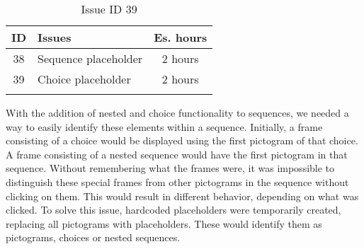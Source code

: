 \begin{longtable} { | c | p{12cm} | c | } 
\hline
	ID 	&	Issues	&		 Es. hours \\\hline
	38	&	Sequence placeholder	&	2 hours \\\hline
	39 	&	Choice placeholder	&	2 hours \\\hline
\caption{Issue ID 39}
\label{tab:spr3_choiceplaceholder}
\end{longtable}

With the addition of nested and choice functionality to sequences, we needed a way to easily identify these elements within a sequence. Initially, a frame consisting of a choice would be displayed using the first pictogram of that choice. A frame consisting of a nested sequence would have the first pictogram in that sequence. Without remembering what the frames were, it was impossible to distinguish these special frames from other pictograms in the sequence without clicking on them. This would result in different behavior, depending on what was clicked. To solve this issue, hardcoded placeholders were temporarily created, replacing all pictograms with placeholders. These would identify them as pictograms, choices or nested sequences.	
